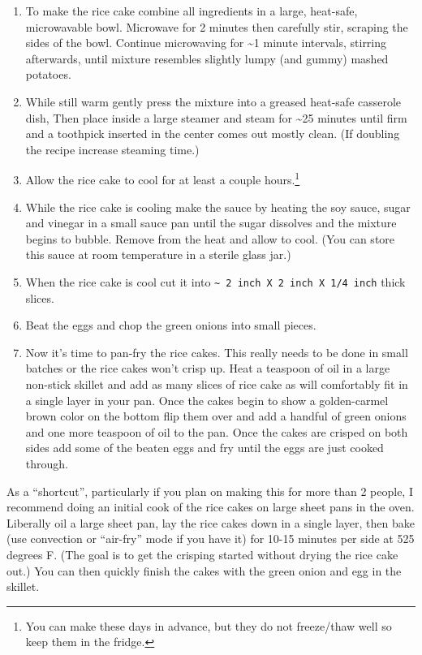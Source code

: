 \documentclass[
]{book}
\begin{document}
\begin{enumerate}
\def\labelenumi{\arabic{enumi}.}
\item
  To make the rice cake combine all ingredients in a large, heat-safe, microwavable bowl. Microwave for 2 minutes then carefully stir, scraping the sides of the bowl. Continue microwaving for \textasciitilde1 minute intervals, stirring afterwards, until mixture resembles slightly lumpy (and gummy) mashed potatoes.
\item
  While still warm gently press the mixture into a greased heat-safe casserole dish, Then place inside a large steamer and steam for \textasciitilde25 minutes until firm and a toothpick inserted in the center comes out mostly clean. (If doubling the recipe increase steaming time.)
\item
  Allow the rice cake to cool for at least a couple hours.\footnote{You can make these days in advance, but they do not freeze/thaw well so keep them in the fridge.}
\item
  While the rice cake is cooling make the sauce by heating the soy sauce, sugar and vinegar in a small sauce pan until the sugar dissolves and the mixture begins to bubble. Remove from the heat and allow to cool. (You can store this sauce at room temperature in a sterile glass jar.)
\item
  When the rice cake is cool cut it into \texttt{\textasciitilde{}\ 2\ inch\ X\ 2\ inch\ X\ 1/4\ inch} thick slices.
\item
  Beat the eggs and chop the green onions into small pieces.
\item
  Now it's time to pan-fry the rice cakes. This really needs to be done in small batches or the rice cakes won't crisp up. Heat a teaspoon of oil in a large non-stick skillet and add as many slices of rice cake as will comfortably fit in a single layer in your pan. Once the cakes begin to show a golden-carmel brown color on the bottom flip them over and add a handful of green onions and one more teaspoon of oil to the pan. Once the cakes are crisped on both sides add some of the beaten eggs and fry until the eggs are just cooked through.
\end{enumerate}

As a ``shortcut'', particularly if you plan on making this for more than 2 people, I recommend doing an initial cook of the rice cakes on large sheet pans in the oven. Liberally oil a large sheet pan, lay the rice cakes down in a single layer, then bake (use convection or ``air-fry'' mode if you have it) for 10-15 minutes per side at 525 degrees F. (The goal is to get the crisping started without drying the rice cake out.) You can then quickly finish the cakes with the green onion and egg in the skillet.
\end{document}
